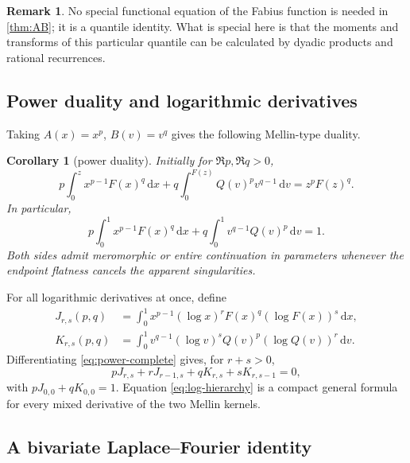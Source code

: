 \documentclass[11pt,oneside]{article}
\newtheorem{corollary}[theorem]{Corollary}
\theoremstyle{definition}
\newtheorem{remark}[theorem]{Remark}
\newcommand{\F}{F}
\newcommand{\Q}{Q}
\newcommand{\dd}{\,\mathrm d}
\begin{document}
\begin{remark}
No special functional equation of the Fabius function is needed in
\cref{thm:AB}; it is a quantile identity.  What is special here is that the moments and
transforms of this particular quantile can be calculated by dyadic products and rational
recurrences.
\end{remark}

\subsection{Power duality and logarithmic derivatives}

Taking \(A(x)=x^p\), \(B(v)=v^q\) gives the following Mellin-type duality.

\begin{corollary}[power duality]\label{cor:power-duality}
Initially for \(\Re p,\Re q>0\),
\begin{equation}\label{eq:power-incomplete}
 p\int_0^z x^{p-1}\F(x)^q\dd x
 +q\int_0^{\F(z)}\Q(v)^p v^{q-1}\dd v
 =z^p\F(z)^q.
\end{equation}
In particular,
\begin{equation}\label{eq:power-complete}
 p\int_0^1x^{p-1}\F(x)^q\dd x
 +q\int_0^1v^{q-1}\Q(v)^p\dd v=1.
\end{equation}
Both sides admit meromorphic or entire continuation in parameters whenever the endpoint
flatness cancels the apparent singularities.
\end{corollary}

For all logarithmic derivatives at once, define
\begin{align}
 J_{r,s}(p,q)&=\int_0^1x^{p-1}(\log x)^r\F(x)^q(\log\F(x))^s\dd x,\label{eq:Jrs}\\
 K_{r,s}(p,q)&=\int_0^1v^{q-1}(\log v)^s\Q(v)^p(\log\Q(v))^r\dd v.\label{eq:Krs}
\end{align}
Differentiating \cref{eq:power-complete} gives, for \(r+s>0\),
\begin{equation}\label{eq:log-hierarchy}
 pJ_{r,s}+rJ_{r-1,s}+qK_{r,s}+sK_{r,s-1}=0,
\end{equation}
with \(pJ_{0,0}+qK_{0,0}=1\).  Equation \cref{eq:log-hierarchy} is a compact
general formula for every mixed derivative of the two Mellin kernels.

\subsection{A bivariate Laplace--Fourier identity}
\end{document}
